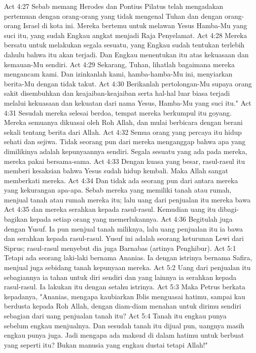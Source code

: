 Act 4:27  Sebab memang Herodes dan Pontius Pilatus telah mengadakan pertemuan dengan orang-orang yang tidak mengenal Tuhan dan dengan orang-orang Israel di kota ini. Mereka bertemu untuk melawan Yesus Hamba-Mu yang suci itu, yang sudah Engkau angkat menjadi Raja Penyelamat.
Act 4:28  Mereka bersatu untuk melakukan segala sesuatu, yang Engkau sudah tentukan terlebih dahulu bahwa itu akan terjadi. Dan Engkau menentukan itu atas kekuasaan dan kemauan-Mu sendiri.
Act 4:29  Sekarang, Tuhan, lihatlah bagaimana mereka mengancam kami. Dan izinkanlah kami, hamba-hamba-Mu ini, menyiarkan berita-Mu dengan tidak takut.
Act 4:30  Berikanlah pertolongan-Mu supaya orang sakit disembuhkan dan keajaiban-keajaiban serta hal-hal luar biasa terjadi melalui kekuasaan dan kekuatan dari nama Yesus, Hamba-Mu yang suci itu."
Act 4:31  Sesudah mereka selesai berdoa, tempat mereka berkumpul itu goyang. Mereka semuanya dikuasai oleh Roh Allah, dan mulai berbicara dengan berani sekali tentang berita dari Allah.
Act 4:32  Semua orang yang percaya itu hidup sehati dan sejiwa. Tidak seorang pun dari mereka menganggap bahwa apa yang dimilikinya adalah kepunyaannya sendiri. Segala sesuatu yang ada pada mereka, mereka pakai bersama-sama.
Act 4:33  Dengan kuasa yang besar, rasul-rasul itu memberi kesaksian bahwa Yesus sudah hidup kembali. Maka Allah sangat memberkati mereka.
Act 4:34  Dan tidak ada seorang pun dari antara mereka yang kekurangan apa-apa. Sebab mereka yang memiliki tanah atau rumah, menjual tanah atau rumah mereka itu; lalu uang dari penjualan itu mereka bawa
Act 4:35  dan mereka serahkan kepada rasul-rasul. Kemudian uang itu dibagi-bagikan kepada setiap orang yang memerlukannya.
Act 4:36  Begitulah juga dengan Yusuf. Ia pun menjual tanah miliknya, lalu uang penjualan itu ia bawa dan serahkan kepada rasul-rasul. Yusuf ini adalah seorang keturunan Lewi dari Siprus; rasul-rasul menyebut dia juga Barnabas (artinya Penghibur).
Act 5:1  Tetapi ada seorang laki-laki bernama Ananias. Ia dengan istrinya bernama Safira, menjual juga sebidang tanah kepunyaan mereka.
Act 5:2  Uang dari penjualan itu sebagiannya ia tahan untuk diri sendiri dan yang lainnya ia serahkan kepada rasul-rasul. Ia lakukan itu dengan setahu istrinya.
Act 5:3  Maka Petrus berkata kepadanya, "Ananias, mengapa kaubiarkan Iblis menguasai hatimu, sampai kau berdusta kepada Roh Allah, dengan diam-diam menahan untuk dirimu sendiri sebagian dari uang penjualan tanah itu?
Act 5:4  Tanah itu engkau punya sebelum engkau menjualnya. Dan sesudah tanah itu dijual pun, uangnya masih engkau punya juga. Jadi mengapa ada maksud di dalam hatimu untuk berbuat yang seperti itu? Bukan manusia yang engkau dustai tetapi Allah!"

